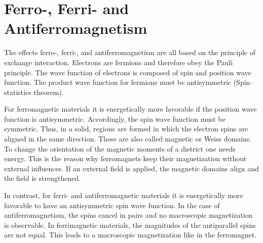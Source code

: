\section{Ferro-, Ferri- and Antiferromagnetism}

The effects ferro-, ferri-, and antiferromagnetism are all based on the principle of exchange interaction. Electrons are fermions and therefore obey the Pauli principle.
The wave function of electrons is composed of spin and position wave function. The product wave function for fermions must be antisymmetric (Spin–statistics theorem).

 For ferromagnetic materials it is energetically more favorable if the position wave function is antisymmetric. Accordingly, the spin wave function must be symmetric.
Thus, in a solid, regions are formed in which the electron spins are aligned in the same direction. These are also called magnetic or Weiss domains. 
To change the orientation of the magnetic moments of a district one needs energy. This is the reason why ferromagnets keep their magnetization without external influences. 
If an external field is applied, the magnetic domains align and the field is strengthened.

In contrast, for ferri- and antiferromagnetic materials it is energetically more favorable to have an antisymmetric spin wave function. 
In the case of antiferromagnetism, the spins cancel in pairs and no macroscopic magnetization is observable.
In ferrimagnetic materials, the magnitudes of the antiparallel spins are not equal. This leads to a macroscopic magnetization like in the ferromagnet.













